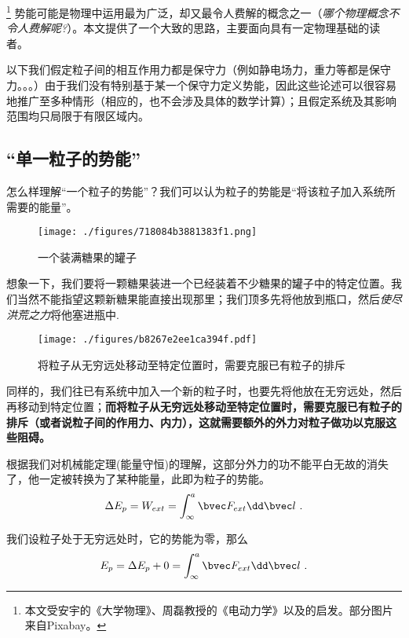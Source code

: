 

\begin{issues}
\issueDraft
\end{issues}

\footnote{本文受安宇的《大学物理》、周磊教授的《电动力学》以及\cite{GriffE}的启发。部分图片来自Pixabay。} 势能可能是物理中运用最为广泛，却又最令人费解的概念之一（\textsl{哪个物理概念不令人费解呢?}）。本文提供了一个大致的思路，主要面向具有一定物理基础的读者。

以下我们假定粒子间的相互作用力都是保守力（例如静电场力，重力等都是保守力。。。）由于我们没有特别基于某一个保守力定义势能，因此这些论述可以很容易地推广至多种情形（相应的，也不会涉及具体的数学计算）；且假定系统及其影响范围均只局限于有限区域内。

\subsection{“单一粒子的势能”}
怎么样理解“一个粒子的势能”？我们可以认为粒子的势能是“将该粒子加入系统所需要的能量”。
\begin{figure}[ht]
\centering
\texttt{[image: ./figures/718084b3881383f1.png]}
\caption{一个装满糖果的罐子} \label{fig_POTENT_4}
\end{figure}
想象一下，我们要将一颗糖果装进一个已经装着不少糖果的罐子中的特定位置。我们当然不能指望这颗新糖果能直接出现那里；我们顶多先将他放到瓶口，然后\textsl{使尽洪荒之力}将他塞进瓶中.

\begin{figure}[ht]
\centering
\texttt{[image: ./figures/b8267e2ee1ca394f.pdf]}
\caption{将粒子从无穷远处移动至特定位置时，需要克服已有粒子的排斥} \label{fig_POTENT_1}
\end{figure}

同样的，我们往已有系统中加入一个新的粒子时，也要先将他放在无穷远处，然后再移动到特定位置；\textbf{而将粒子从无穷远处移动至特定位置时，需要克服已有粒子的排斥（或者说粒子间的作用力、内力），这就需要额外的外力对粒子做功以克服这些阻碍。}

根据我们对机械能定理(能量守恒)的理解，这部分外力的功不能平白无故的消失了，他一定被转换为了某种能量，此即为粒子的势能。
$$\Delta E_p = W_{ext}=\int^a_\infty \bvec F_{ext} \dd \bvec l~. $$

我们设粒子处于无穷远处时，它的势能为零，那么
$$E_p = \Delta E_p + 0 = \int^a_\infty \bvec F_{ext} \dd \bvec l~.$$

